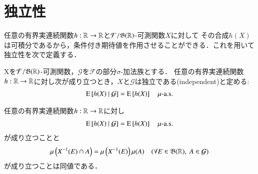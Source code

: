 \section{独立性}
	任意の有界実連続関数$h:\mathbb{R} \rightarrow \mathbb{R}$と$\mathcal{F}/\mathfrak{B}(\mathbb{R})$-可測関数$X$に対して
	その合成$h(X)$は可積分であるから，条件付き期待値を作用させることができる．これを用いて独立性を次で定義する．
	
	\begin{screen}
		\begin{dfn}
			Xを$\mathcal{F}/\mathfrak{B}(\mathbb{R})$-可測関数，$\mathcal{G}$を$\mathcal{F}$の部分$\sigma$-加法族とする．
			任意の有界実連続関数$h:\mathbb{R} \rightarrow \mathbb{R}$に対し次が成り立つとき，$X$と$\mathcal{G}$は独立である(independent)と定める:
			\begin{align}
				\operatorname{E} \left[ h(X) \ \middle|\ \mathcal{G} \right] = \operatorname{E} \left[ h(X) \right] \quad \mbox{$\mu$-a.s.}
			\end{align}
		\end{dfn}
	\end{screen}
	
	\begin{screen}
		\begin{prp}[独立性の同値条件]
			任意の有界実連続関数$h:\mathbb{R} \rightarrow \mathbb{R}$に対し
			\begin{align}
				\operatorname{E} \left[ h(X) \ \middle|\ \mathcal{G} \right] = \operatorname{E} \left[ h(X) \right] \quad \mbox{$\mu$-a.s.}
				\label{eq:prp_equivalent_condition_of_independence_1}
			\end{align}
			が成り立つことと
			\begin{align}
				\mu\left( X^{-1}(E) \cap A \right) = \mu\left( X^{-1}(E) \right)\mu(A) \quad (\forall E \in \mathfrak{B}(\mathbb{R}),\ A \in \mathcal{G})
				\label{eq:prp_equivalent_condition_of_independence_2}
			\end{align}
			が成り立つことは同値である．
		\end{prp}
	\end{screen}
	
